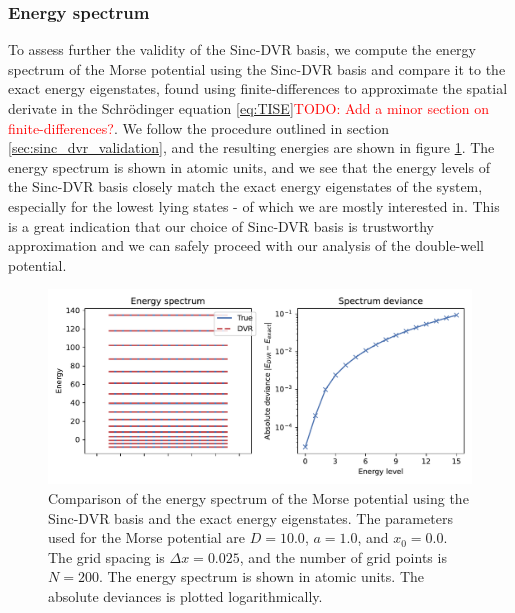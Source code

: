 \documentclass{subfiles}
\begin{document}
\subsubsection*{Energy spectrum}
To assess further the validity of the Sinc-DVR basis, we compute the energy spectrum of the Morse potential using the Sinc-DVR basis and compare it to the exact energy eigenstates, found using finite-differences to approximate the spatial derivate in the Schrödinger equation \eqref{eq:TISE}\textcolor{red}{TODO: Add a minor section on finite-differences?}. We follow the procedure outlined in section \ref{sec:sinc_dvr_validation}, and the resulting energies are shown in figure \ref{fig:dvr_validation}. The energy spectrum is shown in atomic units, and we see that the energy levels of the Sinc-DVR basis closely match the exact energy eigenstates of the system, especially for the lowest lying states - of which we are mostly interested in. This is a great indication that our choice of Sinc-DVR basis is trustworthy approximation and we can safely proceed with our analysis of the double-well potential. 
\begin{figure}[h!]
    \centering
    \includegraphics[width=\textwidth]{figs/dvr_validation.pdf}
    \caption{Comparison of the energy spectrum of the Morse potential using the Sinc-DVR basis and the exact energy eigenstates. The parameters used for the Morse potential are $D = 10.0$, $a = 1.0$, and $x_0 = 0.0$. The grid spacing is $\Delta x = 0.025$, and the number of grid points is $N = 200$. The energy spectrum is shown in atomic units. The absolute deviances is plotted logarithmically.}
    \label{fig:dvr_validation}
\end{figure}
\end{document}
